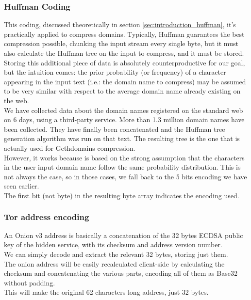 \documentclass[main.tex]{subfiles}
\begin{document}
\subsubsection{Huffman Coding}
This coding, discussed theoretically in section \ref{sec:introduction_huffman}, it's practically applied to compress domains. Typically, Huffman guarantees the best compression possible, chunking the input stream every single byte, but it must also calculate the Huffman tree on the input to compress, and it must be stored. Storing this additional piece of data is absolutely counterproductive for our goal, but the intuition comes: the prior probability (or frequency) of a character appearing in the input text (i.e.: the domain name to compress) may be assumed to be very similar with respect to the average domain name already existing on the web.\\
We have collected data about the domain names registered on the standard web on 6 days, using a third-party service. More than 1.3 million domain names have been collected. They have finally been concatenated and the Huffman tree generation algorithm was run on that text.
The resulting tree is the one that is actually used for Gethdomains compression.\\
However, it works because is based on the strong assumption that the characters in the user input domain name follow the same probability distribution. This is not always the case, so in those cases, we fall back to the 5 bits encoding we have seen earlier.\\
The first bit (not byte) in the resulting byte array indicates the encoding used.

\subsubsection{Tor address encoding}
An Onion v3 address is basically a concatenation of the 32 bytes ECDSA public key of the hidden service, with its checksum and address version number.\cite{Tor_v3}\\
We can simply decode and extract the relevant 32 bytes, storing just them.\\
The onion address will be easily recalculated client-side by calculating the checksum and concatenating the various parts, encoding all of them as Base32 without padding.\\
This will make the original 62 characters long address, just 32 bytes.
\end{document}
